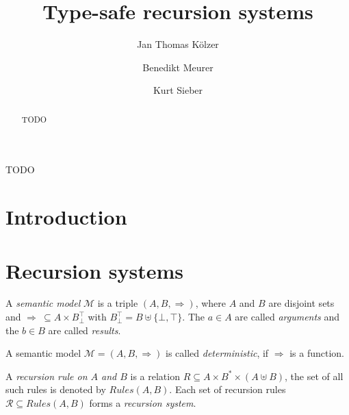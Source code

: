 \documentclass[a4paper,final,preprint,sort&compress]{elsarticle}
\newcommand{\M}{\ensuremath{\mathcal{M}}}
\newcommand{\R}{\ensuremath{\mathcal{R}}}
\newcommand{\Rules}{\ensuremath{\mathit{Rules}}}
\begin{document}
\begin{frontmatter}

\title{Type-safe recursion systems}

\author[fnt]{Jan Thomas K\"olzer}
\author[cus]{Benedikt Meurer}
\author[cus]{Kurt Sieber}
\address[fnt]{Naturwissenschaftlich-Technische Fakult\"at, Universit\"at Siegen, D-57068 Siegen, Germany}
\address[cus]{Compilerbau und Softwareanalyse, Universit\"at Siegen, D-57068 Siegen, Germany}

\begin{abstract}
  TODO
\end{abstract}

\begin{keyword}
  TODO
\end{keyword}

\end{frontmatter}


\section{Introduction}
\label{sec:Introduction}




\section{Recursion systems}
\label{sec:Recursion_systems}


A \emph{semantic model} $\M$ is a triple $(A,B,\Rightarrow)$, where $A$ and $B$ are disjoint sets
and \mbox{$\Rightarrow~\subseteq A \times B_\bot^\top$} with $B_\bot^\top = B \uplus \{\bot,\top\}$. The $a \in A$
are called \emph{arguments} and the $b \in B$ are called \emph{results}.

\begin{definition}
  A semantic model $\M = (A,B,\Rightarrow)$ is called \emph{deterministic}, if $\Rightarrow$ is a function.
\end{definition}

A \emph{recursion rule on $A$ and $B$} is a relation $R \subseteq A \times B^* \times (A \uplus B)$, the set
of all such rules is denoted by $\Rules(A,B)$. Each set of recursion rules \mbox{$\R \subseteq \Rules(A,B)$} forms a
\emph{recursion system}.
\end{document}
